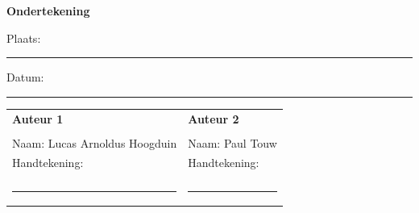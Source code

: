 \documentclass[11pt]{article}
\begin{document}
\vspace{1cm} 

\textbf{Ondertekening} 

\vspace{0.5cm} Plaats: \rule{6cm}{0.4pt} Datum: \rule{6cm}{0.4pt} \vspace{1cm} 

\begin{tabular}{p{7cm} p{7cm}} \textbf{Auteur 1} & \textbf{Auteur 2} \\ 
    
\vspace{2cm} & \vspace{2cm} \\ 

Naam: Lucas Arnoldus Hoogduin & Naam: Paul Touw \\ 
Handtekening: & Handtekening:\\   
\vspace{2cm} & \vspace{2cm} \\ 
\rule{6cm}{0.4pt} & \rule{6cm}{0.4pt} \\ 

\end{tabular} 
\end{document}
